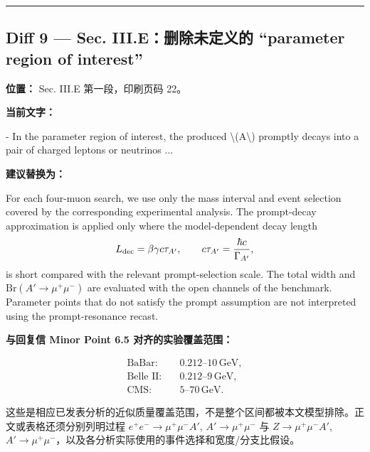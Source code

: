 \documentclass[
]{article}
\newenvironment{Shaded}{}{}
\newcommand{\StringTok}[1]{\textcolor[rgb]{0.25,0.44,0.63}{#1}}
\begin{document}
\begin{center}\rule{0.5\linewidth}{0.5pt}\end{center}

\subsection{Diff 9 --- Sec. III.E：删除未定义的 ``parameter region of
interest''}\label{diff-9-sec.-iii.eux5220ux9664ux672aux5b9aux4e49ux7684-parameter-region-of-interest}

\textbf{位置：} Sec. III.E 第一段，印刷页码 22。

\textbf{当前文字：}

\begin{Shaded}
\begin{Highlighting}[]
\StringTok{{-} In the parameter region of interest, the produced \textbackslash{}(A\textquotesingle{}\textbackslash{}) promptly decays into a pair of charged leptons or neutrinos ...}
\end{Highlighting}
\end{Shaded}

\textbf{建议替换为：}

For each four-muon search, we use only the mass interval and event
selection covered by the corresponding experimental analysis. The
prompt-decay approximation is applied only where the model-dependent
decay length
\[
L_{\rm dec}=\beta\gamma c\tau_{A'},
\qquad
c\tau_{A'}=\frac{\hbar c}{\Gamma_{A'}},
\]
is short compared with the relevant prompt-selection scale. The total
width and \(\mathrm{Br}(A'\to\mu^+\mu^-)\) are evaluated with the open
channels of the benchmark. Parameter points that do not satisfy the
prompt assumption are not interpreted using the prompt-resonance recast.

\textbf{与回复信 Minor Point 6.5 对齐的实验覆盖范围：}

\[
\begin{aligned}
\text{BaBar}:&\quad 0.212\text{--}10\,\mathrm{GeV},\\
\text{Belle II}:&\quad 0.212\text{--}9\,\mathrm{GeV},\\
\text{CMS}:&\quad 5\text{--}70\,\mathrm{GeV}.
\end{aligned}
\]

这些是相应已发表分析的近似质量覆盖范围，不是整个区间都被本文模型排除。正文或表格还须分别列明过程
\(e^+e^-\to\mu^+\mu^-A'\), \(A'\to\mu^+\mu^-\) 与 \(Z\to\mu^+\mu^-A'\),
\(A'\to\mu^+\mu^-\)，以及各分析实际使用的事件选择和宽度/分支比假设。
\end{document}
